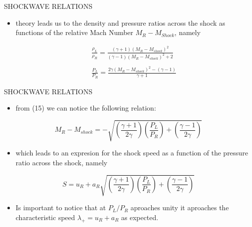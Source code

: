 \documentclass{beamer}
\begin{document}
\begin{frame}{SHOCKWAVE RELATIONS}
  \begin{itemize}
   \item theory leads us to the density and pressure ratios across the shock as functions of the relative Mach Number $M_R-M_{Shock}$, namely
  \end{itemize}
  \begin{eqnarray}
    &&\frac{\rho_L}{\rho_R}=\frac{(\gamma+1)(M_R-M_{shock})^2}{(\gamma-1)(M_R-M_{shock})^2+2}\\
    &&\nonumber \\
    &&\frac{P_L}{P_R}=\frac{2\gamma(M_R-M_{shock})^2-(\gamma-1)}{\gamma+1}
  \end{eqnarray}
\end{frame}

\begin{frame}{SHOCKWAVE RELATIONS}
  \begin{itemize}
   \item from \alert{(15)} we can notice the following relation:
  \end{itemize}
  \begin{equation}
   M_R-M_{shock}=-\sqrt{\left ( \frac{\gamma+1}{2\gamma} \right )\left ( \frac{P_L}{P_R} \right )+\left ( \frac{\gamma-1}{2\gamma} \right )}
  \end{equation}
  \begin{itemize}
   \item which leads to an expresion for the shock speed as a function of the pressure ratio across the shock, namely
  \end{itemize}
  \begin{equation}
   S=u_R+a_R\sqrt{\left ( \frac{\gamma+1}{2\gamma} \right )\left ( \frac{P_L}{P_R} \right )+\left ( \frac{\gamma-1}{2\gamma} \right )}
  \end{equation}
  \begin{itemize}
   \item Is important to notice that at $P_L/P_R$ aproaches unity it aproaches the characteristic speed $\lambda_+=u_R+a_R$ as expected.
  \end{itemize}
\end{frame}
\end{document}
